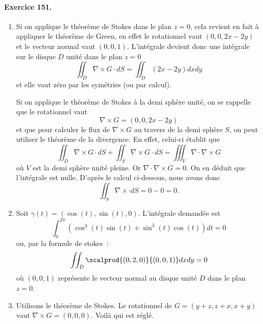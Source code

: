 \paragraph{Exercice 151.}
\begin{enumerate}

\item Si on applique le théorème de Stokes dans le plan $z = 0$, cela revient en fait à appliquer le théorème de Green, en effet le rotationnel vaut $(0, 0, 2 x - 2 y)$ et le vecteur normal vaut $(0,0,1)$. L'intégrale devient donc une intégrale sur le disque $D$ unité dans le plan $z = 0$
\begin{equation*}
\iint_D \nabla\times G \cdot d S = \iint_D (2x - 2 y) d x d y
\end{equation*}
et elle vaut zéro par les symétries (ou par calcul).

Si on applique le théorème de Stokes à la demi sphère unité, on se rappelle que le rotationnel vaut
\begin{equation*}
\nabla\times G = (0, 0, 2x - 2 y)
\end{equation*}
et que pour calculer le flux de $\nabla\times G$ au travers de la demi sphère $S$, on peut utiliser le théorème de la divergence. En effet, celui-ci établit que
\begin{equation*}
\iint_D \nabla\times G \cdot d S + \iint_S \nabla\times G \cdot d S = \iiint_V
\nabla\cdot \nabla\times G
\end{equation*}
où $V$ est la demi sphère unité pleine. Or $\nabla\cdot\nabla\times G = 0$. On en
déduit que l'intégrale est nulle. D'après le calcul ci-dessous, nous
avons donc
\begin{equation*}
\iint_S \nabla\times \cdot d S = 0 - 0 = 0.
\end{equation*}

\item Soit $\gamma(t) = (\cos(t), \sin(t), 0)$. L'intégrale demandée
est
\begin{equation*}
\int_0^{2\pi} (\cos^3(t) \sin(t) + \sin^3(t) \cos(t)) d t = 0
\end{equation*}
ou, par la formule de stokes~:
\begin{equation*}
\iint_D \scalprod{(0,2,0)}{(0,0,1)} d x d y = 0
\end{equation*}
où $(0,0,1)$ représente le vecteur normal au disque unité $D$ dans
le plan $z = 0$.

\item Utilisons le théorème de Stokes. Le rotationnel de $G =
(y+z,z+x,x+y)$ vaut $\nabla\times G = (0,0,0)$. Voilà qui est réglé.


\end{enumerate}
